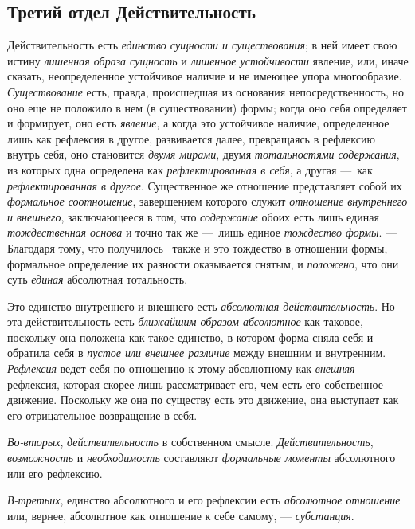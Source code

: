 \clearpage\subsection{Третий отдел Действительность}
Действительность есть
{\em единство сущности и существования}; в ней имеет
свою истину {\em лишенная образа сущность} и
{\em лишенное устойчивости} явление, или, иначе
сказать, неопределенное устойчивое наличие и не имеющее упора многообразие.
{\em Существование} есть, правда, происшедшая из
основания непосредственность, но оно еще не положило в нем (в
существовании) формы; когда оно себя определяет и формирует, оно есть
{\em явление}, а когда это устойчивое наличие,
определенное лишь как рефлексия в другое, развивается далее, превращаясь в
рефлексию внутрь себя, оно становится {\em двумя
мирами}, двумя {\em тотальностями содержания}, из
которых одна определена как {\em рефлектированная в
себя}, а другая —~как {\em рефлектированная в другое}.
Существенное же отношение представляет собой их
{\em формальное соотношение}, завершением которого
служит {\em отношение внутреннего и внешнего},
заключающееся в том, что {\em содержание} обоих есть
лишь единая {\em тождественная основа} и точно так же
—~лишь единое {\em тождество формы}. — Благодаря тому,
что получилось \ также и это тождество в отношении формы, формальное
определение их разности оказывается снятым, и
{\em положено}, что они суть
{\em единая} абсолютная тотальность.

Это единство внутреннего и внешнего есть {\em абсолютная
действительность}. Но эта действительность есть
{\em ближайшим образом абсолютное} как таковое,
поскольку она положена как такое единство, в котором форма сняла себя и
обратила себя в {\em пустое или внешнее различие} между
внешним и внутренним. {\em Рефлексия} ведет себя по
отношению к этому абсолютному как {\em внешняя}
рефлексия, которая скорее лишь рассматривает его, чем есть его собственное
движение. Поскольку же она по существу есть это движение, она выступает как
его отрицательное возвращение в себя.

{\em Во-вторых},
{\em действительность} в собственном смысле.
{\em Действительность},
{\em возможность} и
{\em необходимость} составляют
{\em формальные моменты} абсолютного или его рефлексию.

{\em В-третьих}, единство абсолютного и его рефлексии
есть {\em абсолютное отношение} или, вернее, абсолютное
как отношение к себе самому, — {\em субстанция}.

